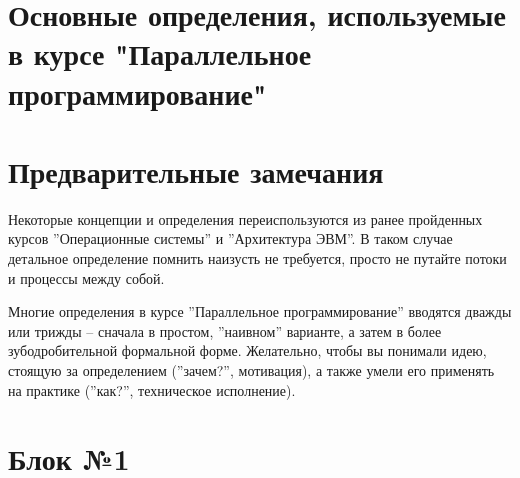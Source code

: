 \documentclass[a4paper, 12pt]{extarticle}
\title{}
\author{}
\date{}
\begin{document}
\section*{Основные определения, используемые в курсе "Параллельное программирование"}

\section*{Предварительные замечания}

Некоторые концепции и определения переиспользуются из ранее пройденных курсов ''Операционные системы'' и ''Архитектура ЭВМ''.
В таком случае детальное определение помнить наизусть не требуется, просто не путайте потоки и процессы между собой.

Многие определения в курсе ''Параллельное программирование'' вводятся дважды или трижды -- сначала в простом, ''наивном'' варианте, а затем в более зубодробительной формальной форме. Желательно, чтобы вы понимали идею, стоящую за определением (''зачем?'', мотивация), а также умели его применять на практике (''как?'', техническое исполнение).

\section{Блок №1}
\end{document}
